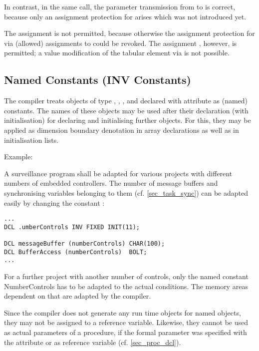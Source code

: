 In contrast, in the same call, the parameter transmission from 
 to 
is correct, because only an assignment protection for  arises which
was not introduced yet.

The assignment  is not permitted, because otherwise the assignment
protection for  via (allowed) assignments to 
 could be revoked.
The assignment , however, is permitted; a value modification
of the tabular element via  is not possible.

\subsection{Named Constants (INV Constants)}   %
\label{sec_named_const}

The compiler treats objects of type , ,
 ,  and
 declared with attribute 
 as (named) constants. The names of
these objects may be used after their declaration (with initialisation)
for declaring and initialising further objects. For this, they may be
applied as dimension boundary denotation in array declarations as well
as in initialisation lists.

\begin{minipage}{\linewidth}
Example:

A surveillance program shall be adapted for various projects with
different numbers of embedded controllers. The number of message
buffers and synchronising variables belonging to them 
(cf. \ref{sec_task_sync}) can be
adapted easily by changing the constant :

\begin{lstlisting}
...
DCL .umberControls INV FIXED INIT(11);

DCL messageBuffer (numberControls) CHAR(100); 
DCL BufferAccess (numberControls)  BOLT;
...
\end{lstlisting}
\end{minipage}

For a further project with another number of controls, only the named
constant NumberControls has to be adapted to the actual conditions. The
memory areas dependent on that are adapted by the compiler.

Since the compiler does not generate any run time objects for named
objects, they may not be assigned to a reference variable. Likewise,
they cannot be used as actual parameters of a procedure, if the formal
parameter was specified with the   attribute or as reference
variable (cf. \ref{sec_proc_dcl}).

